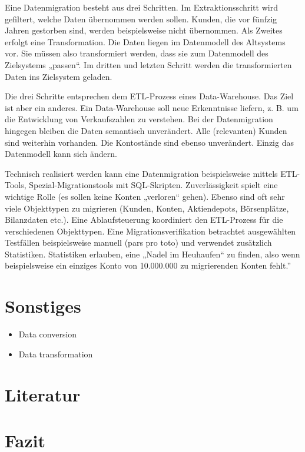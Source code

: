 \documentclass[11pt]{scrartcl}
\newif\iffull
\begin{document}
Eine Datenmigration besteht aus drei Schritten. Im Extraktionsschritt wird gefiltert, welche Daten übernommen werden sollen. Kunden, die vor fünfzig Jahren gestorben sind, werden beispielsweise nicht übernommen. Als Zweites erfolgt eine Transformation. Die Daten liegen im Datenmodell des Altsystems vor. Sie müssen also transformiert werden, dass sie zum Datenmodell des Zielsystems „passen“. Im dritten und letzten Schritt werden die transformierten Daten ins Zielsystem geladen.

Die drei Schritte entsprechen dem ETL-Prozess eines Data-Warehouse. Das Ziel ist aber ein anderes. Ein Data-Warehouse soll neue Erkenntnisse liefern, z. B. um die Entwicklung von Verkaufszahlen zu verstehen. Bei der Datenmigration hingegen bleiben die Daten semantisch unverändert. Alle (relevanten) Kunden sind weiterhin vorhanden. Die Kontostände sind ebenso unverändert. Einzig das Datenmodell kann sich ändern.

Technisch realisiert werden kann eine Datenmigration beispielsweise mittels ETL-Tools, Spezial-Migrationstools mit SQL-Skripten. Zuverlässigkeit spielt eine wichtige Rolle (es sollen keine Konten „verloren“ gehen). Ebenso sind oft sehr viele Objekttypen zu migrieren (Kunden, Konten, Aktiendepots, Börsenplätze, Bilanzdaten etc.). Eine Ablaufsteuerung koordiniert den ETL-Prozess für die verschiedenen Objekttypen. Eine Migrationsverifikation betrachtet ausgewählten Testfällen beispielsweise manuell (pars pro toto) und verwendet zusätzlich Statistiken. Statistiken erlauben, eine „Nadel im Heuhaufen“ zu finden, also wenn beispielsweise ein einziges Konto von 10.000.000 zu migrierenden Konten fehlt.''

\section{Sonstiges}

\begin{itemize}
	\item Data conversion
	\item Data transformation
\end{itemize}

\section{Literatur}

\section{Fazit}

\iffull
\newpage

%
\addcontentsline{toc}{section}{\bibname}


\fi
\end{document}
